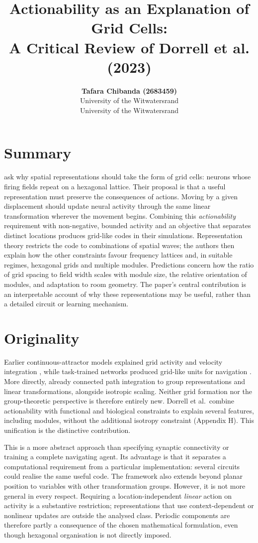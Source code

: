 \documentclass[10pt,letterpaper]{article}
\title{Actionability as an Explanation of Grid Cells:\\A Critical Review of Dorrell et al. (2023)}
\author{{\large\bf Tafara Chibanda (2683459)}\\University of the Witwatersrand
\And {\large\bf Nathan Le Roux (2717495)}\\University of the Witwatersrand}
\begin{document}
\maketitle

\section{Summary}
\citet{dorrell2023} ask why spatial representations should take the form of grid cells: neurons whose firing fields repeat on a hexagonal lattice. Their proposal is that a useful representation must preserve the consequences of actions. Moving by a given displacement should update neural activity through the same linear transformation wherever the movement begins. Combining this \emph{actionability} requirement with non-negative, bounded activity and an objective that separates distinct locations produces grid-like codes in their simulations. Representation theory restricts the code to combinations of spatial waves; the authors then explain how the other constraints favour frequency lattices and, in suitable regimes, hexagonal grids and multiple modules. Predictions concern how the ratio of grid spacing to field width scales with module size, the relative orientation of modules, and adaptation to room geometry. The paper's central contribution is an interpretable account of why these representations may be useful, rather than a detailed circuit or learning mechanism.

\section{Originality}
Earlier continuous-attractor models explained grid activity and velocity integration \citep{burak2009}, while task-trained networks produced grid-like units for navigation \citep{banino2018}. More directly, \citet{gao2021} already connected path integration to group representations and linear transformations, alongside isotropic scaling. Neither grid formation nor the group-theoretic perspective is therefore entirely new. Dorrell et al.\ combine actionability with functional and biological constraints to explain several features, including modules, without the additional isotropy constraint (Appendix H). This unification is the distinctive contribution.

This is a more abstract approach than specifying synaptic connectivity or training a complete navigating agent. Its advantage is that it separates a computational requirement from a particular implementation: several circuits could realise the same useful code. The framework also extends beyond planar position to variables with other transformation groups. However, it is not more general in every respect. Requiring a location-independent \emph{linear} action on activity is a substantive restriction; representations that use context-dependent or nonlinear updates are outside the analysed class. Periodic components are therefore partly a consequence of the chosen mathematical formulation, even though hexagonal organisation is not directly imposed.
\end{document}
